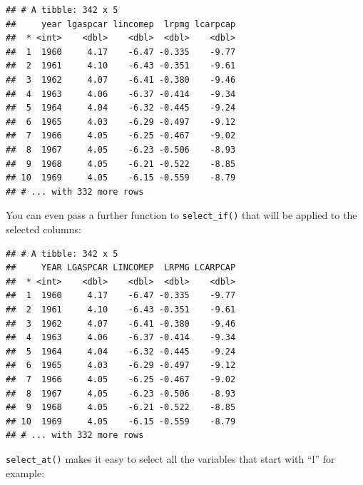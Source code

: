\documentclass[]{gitbook}
\newenvironment{Shaded}{\begin{snugshade}}{\end{snugshade}}
\newcommand{\KeywordTok}[1]{\textcolor[rgb]{0.13,0.29,0.53}{\textbf{#1}}}
\newcommand{\NormalTok}[1]{#1}
\newcommand{\OperatorTok}[1]{\textcolor[rgb]{0.81,0.36,0.00}{\textbf{#1}}}
\newcommand{\StringTok}[1]{\textcolor[rgb]{0.31,0.60,0.02}{#1}}
\theoremstyle{definition}
\theoremstyle{definition}
\theoremstyle{definition}
\theoremstyle{remark}
\begin{document}
\begin{verbatim}
## # A tibble: 342 x 5
##     year lgaspcar lincomep  lrpmg lcarpcap
##  * <int>    <dbl>    <dbl>  <dbl>    <dbl>
##  1  1960     4.17    -6.47 -0.335    -9.77
##  2  1961     4.10    -6.43 -0.351    -9.61
##  3  1962     4.07    -6.41 -0.380    -9.46
##  4  1963     4.06    -6.37 -0.414    -9.34
##  5  1964     4.04    -6.32 -0.445    -9.24
##  6  1965     4.03    -6.29 -0.497    -9.12
##  7  1966     4.05    -6.25 -0.467    -9.02
##  8  1967     4.05    -6.23 -0.506    -8.93
##  9  1968     4.05    -6.21 -0.522    -8.85
## 10  1969     4.05    -6.15 -0.559    -8.79
## # ... with 332 more rows
\end{verbatim}

You can even pass a further function to \texttt{select\_if()} that will
be applied to the selected columns:

\begin{Shaded}
\end{Shaded}

\begin{verbatim}
## # A tibble: 342 x 5
##     YEAR LGASPCAR LINCOMEP  LRPMG LCARPCAP
##  * <int>    <dbl>    <dbl>  <dbl>    <dbl>
##  1  1960     4.17    -6.47 -0.335    -9.77
##  2  1961     4.10    -6.43 -0.351    -9.61
##  3  1962     4.07    -6.41 -0.380    -9.46
##  4  1963     4.06    -6.37 -0.414    -9.34
##  5  1964     4.04    -6.32 -0.445    -9.24
##  6  1965     4.03    -6.29 -0.497    -9.12
##  7  1966     4.05    -6.25 -0.467    -9.02
##  8  1967     4.05    -6.23 -0.506    -8.93
##  9  1968     4.05    -6.21 -0.522    -8.85
## 10  1969     4.05    -6.15 -0.559    -8.79
## # ... with 332 more rows
\end{verbatim}

\texttt{select\_at()} makes it easy to select all the variables that
start with ``l'' for example:

\begin{Shaded}
\end{Shaded}
\end{document}
